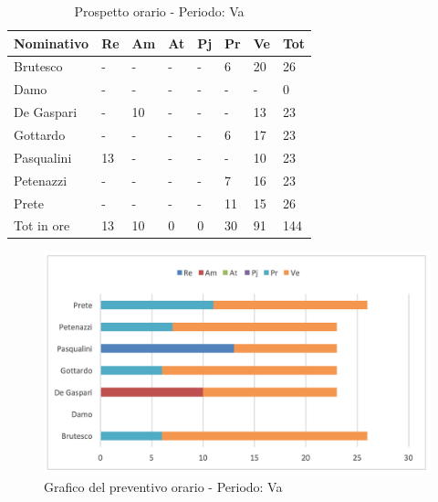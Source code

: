 							\begin{table}[H] \begin{center} \begin{tabular}{llllllll}
							\toprule
							\textbf{Nominativo}		&	\textbf{Re}	&	\textbf{Am}	&	\textbf{At}	&	\textbf{Pj}	&	\textbf{Pr}	&	\textbf{Ve}	&	\textbf{Tot}\\
							\midrule
							Brutesco	&	-	&	-	&	-	&	-	&	6	&	20	&	26	 \\
							Damo	&	-	&	-	&	-	&	-	&	-	&	-	&	0	 \\
							De Gaspari	&	-	&	10	&	-	&	-	&	-	&	13	&	23	 \\
							Gottardo	&	-	&	-	&	-	&	-	&	6	&	17	&	23	 \\
							Pasqualini	&	13	&	-	&	-	&	-	&	-	&	10	&	23	 \\
							Petenazzi	&	-	&	-	&	-	&	-	&	7	&	16	&	23	 \\
							Prete	&	-	&	-	&	-	&	-	&	11	&	15	&	26	 \\
							\midrule
							Tot in ore	&	13	&	10	&	0	&	0	&	30	&	91	&	144	 \\


							\bottomrule
							\end{tabular} \end{center} \caption{Prospetto orario - Periodo:
							Va
							}\label{tab:h_Va} \end{table}		\begin{figure}[H]  \centering  \includegraphics[scale=0.42]{img/h_Va}
									\caption{Grafico del preventivo orario - Periodo: 								Va	}  \label{fig:h_Va} \end{figure}
